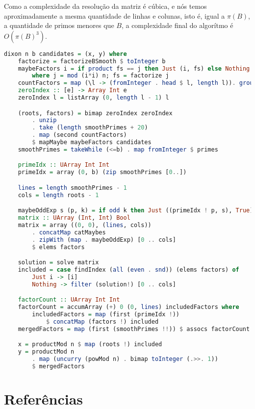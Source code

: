 \documentclass{article}
\begin{document}
Como a complexidade da resolução da matriz é cúbica, e nós temos aproximadamente a mesma quantidade de linhas e colunas, isto é, igual a $\pi(B)$, a quantidade de primos menores que $B$, a complexidade final do algorítmo é $O(\pi(B)^3)$.
\begin{minipage}{0.9\linewidth}
\begin{lstlisting}[language=haskell,caption=Fatoração de Dixon]
dixon n b candidates = (x, y) where
    factorize = factorizeBSmooth $ toInteger b
    maybeFactors i = if product fs == j then Just (i, fs) else Nothing
        where j = mod (i*i) n; fs = factorize j
    countFactors = map (\l -> (fromInteger . head $ l, length l)). group
    zeroIndex :: [e] -> Array Int e
    zeroIndex l = listArray (0, length l - 1) l

    (roots, factors) = bimap zeroIndex zeroIndex
        . unzip
        . take (length smoothPrimes + 20)
        . map (second countFactors)
        $ mapMaybe maybeFactors candidates
    smoothPrimes = takeWhile (<=b) . map fromInteger $ primes

    primeIdx :: UArray Int Int
    primeIdx = array (0, b) (zip smoothPrimes [0..])

    lines = length smoothPrimes - 1
    cols = length roots - 1

    maybeOddExp s (p, k) = if odd k then Just ((primeIdx ! p, s), True) else Nothing
    matrix :: UArray (Int, Int) Bool
    matrix = array ((0, 0), (lines, cols))
        . concatMap catMaybes
        . zipWith (map . maybeOddExp) [0 .. cols]
        $ elems factors

    solution = solve matrix
    included = case findIndex (all (even . snd)) (elems factors) of
        Just i -> [i]
        Nothing -> filter (solution!) [0 .. cols]

    factorCount :: UArray Int Int
    factorCount = accumArray (+) 0 (0, lines) includedFactors where
        includedFactors = map (first (primeIdx !))
            $ concatMap (factors !) included
    mergedFactors = map (first (smoothPrimes !!)) $ assocs factorCount

    x = productMod n $ map (roots !) included
    y = productMod n
        . map (uncurry (powMod n) . bimap toInteger (.>>. 1))
        $ mergedFactors    
\end{lstlisting}
\end{minipage}

\section{Referências}

\printbibliography
\end{document}
